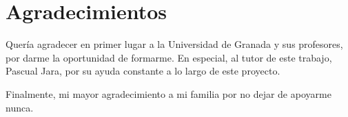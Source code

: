 

\begingroup
\let\clearpage\relax
\let\cleardoublepage\relax
\let\cleardoublepage\relax
\chapter*{Agradecimientos}

Quería agradecer en primer lugar a la Universidad de Granada y sus profesores, por darme la oportunidad de formarme. En especial, al tutor de este trabajo, Pascual Jara, por su ayuda constante a lo largo de este proyecto.

\bigskip

Finalmente, mi mayor agradecimiento a mi familia por no dejar de apoyarme nunca.

\endgroup

